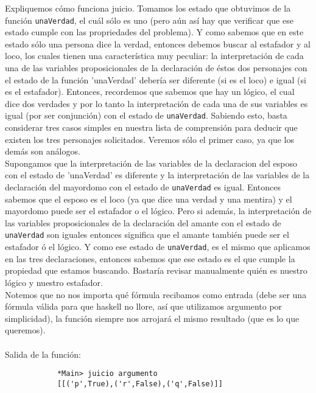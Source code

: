 \documentclass[letterpaper,12pt]{article}
\begin{document}
\begin{itemize}
        Expliquemos cómo funciona juicio. Tomamos los estado que obtuvimos 
        de la función \texttt{unaVerdad}, el cuál sólo es uno (pero aún así 
        hay que verificar que ese estado cumple con las propriedades del 
        problema). Y como sabemos que en este estado sólo una persona dice 
        la verdad, entonces debemos buscar al estafador y al loco, los 
        cuales tienen una característica muy peculiar: la  interpretación 
        de cada una de las variables proposicionales de la declaración de 
        éstos dos personajes con el estado de la función 'unaVerdad' debería 
        ser diferente (si es el loco) e igual (si es el estafador). Entonces, 
        recordemos que sabemos que hay un lógico, el cual dice dos verdades 
        y por lo tanto la interpretación de cada una de sus variables es 
        igual (por ser conjunción) con el estado de \texttt{unaVerdad}. 
        Sabiendo esto, basta considerar tres casos simples en nuestra lista 
        de comprensión para deducir que existen los tres personajes 
        solicitados. Veremos sólo el primer caso, ya que los demás son 
        análogos. \\
        Supongamos que la interpretación de las variables de la declaracion 
        del esposo con el estado de 'unaVerdad' es diferente y la 
        interpretación de las variables de la declaración del mayordomo con 
        el estado de \texttt{unaVerdad} es igual. Entonces sabemos que el esposo 
        es el loco (ya que dice una verdad y una mentira) y el mayordomo 
        puede ser el estafador o el lógico. Pero si además, la interpretación 
        de las variables proposicionales de la declaración del amante con el 
        estado de \texttt{unaVerdad} son iguales entonces significa que el 
        amante también puede ser el estafador ó el lógico. Y como ese estado 
        de \texttt{unaVerdad}, es el mismo que aplicamos en las tres 
        declaraciones, entonces sabemos que ese estado es el que cumple la
        propiedad que estamos buscando. Bastaría revisar manualmente quién es 
        nuestro lógico y nuestro estafador. \\

        Notemos que no nos importa qué fórmula recibamos como entrada 
        (debe ser una fórmula válida para que haskell no llore, así que 
        utilizamos argumento por simplicidad), la función siempre nos 
        arrojará el mismo resultado (que es lo que queremos). \\ \\
        Salida de la función: 
        \begin{lstlisting}
            *Main> juicio argumento
            [[('p',True),('r',False),('q',False)]]
        \end{lstlisting}
    \end{itemize}
\end{document}
